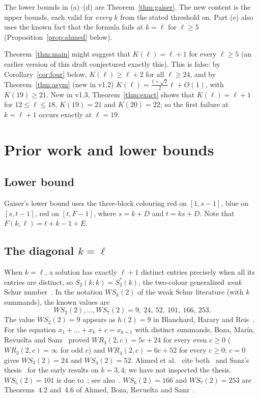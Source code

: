 \documentclass[11pt]{amsart}
\theoremstyle{definition}
\newcommand{\F}{F}
\newcommand{\Stwo}{S_2}
\begin{document}
The lower bounds in (a)--(d) are Theorem~\ref{thm:gaiser}. The new content is the upper bounds, each valid for \emph{every} $k$ from the stated threshold on. Part (e) also uses the known fact that the formula fails at $k=\ell$ for $\ell\ge5$ (Proposition~\ref{prop:ahmed} below).

\noindent Theorem~\ref{thm:main} might suggest that $K(\ell)=\ell+1$ for every $\ell\ge5$ (an earlier version of this draft conjectured exactly this). This is false: by Corollary~\ref{cor:four} below, $K(\ell)\ge\ell+2$ for all $\ell\ge24$, and by Theorem~\ref{thm:asym} (new in v1.2) $K(\ell)=\frac{1+\sqrt2}{2}\ell+O(1)$, with $K(19)\ge21$. New in v1.3, Theorem~\ref{thm:exact} shows that $K(\ell)=\ell+1$ for $12\le\ell\le18$, $K(19)=21$ and $K(20)=22$; so the first failure at $k=\ell+1$ occurs exactly at $\ell=19$.

\section{Prior work and lower bounds}\label{sec:prior}

\subsection*{Lower bound} Gaiser's lower bound uses the three-block colouring red on $[1,s-1]$, blue on $[s,t-1]$, red on $[t,\F-1]$, where $s=k+D$ and $t=ks+D$. Note that $\F(k,\ell)=t+k-1+E$.

\subsection*{The diagonal $k=\ell$} When $k=\ell$, a solution has exactly $\ell+1$ distinct entries precisely when all its entries are distinct, so $\Stwo(k;k)=S_2^*(k)$, the two-colour generalized \emph{weak} Schur number~\cite{Gaiser}. In the notation $WS_k(2)$ of the weak Schur literature (with $k$ summands), the known values are
\[
WS_2(2),\dots,WS_7(2)=9,\ 24,\ 52,\ 101,\ 166,\ 253.
\]
The value $WS_2(2)=9$ appears as $h(2)=9$ in Blanchard, Harary and Reis~\cite{BHR}. For the equation $x_1+\dots+x_k+c=x_{k+1}$ with distinct summands, Boza, Mar\'in, Revuelta and Sanz~\cite{BMRS} proved $WR_3(2,c)=5c+24$ for every even $c\ge0$ ($WR_3(2,c)=\infty$ for odd $c$) and $WR_4(2,c)=6c+52$ for every $c\ge0$; $c=0$ gives $WS_3(2)=24$ and $WS_4(2)=52$. Ahmed et al.~\cite{ABRS} cite both~\cite{BMRS} and Sanz's thesis~\cite{Sanz} for the early results on $k=3,4$; we have not inspected the thesis. $WS_5(2)=101$ is due to~\cite{BMRS}; see also~\cite{BRS}. $WS_6(2)=166$ and $WS_7(2)=253$ are Theorems~4.2 and~4.6 of Ahmed, Boza, Revuelta and Sanz~\cite{ABRS}.
\end{document}
